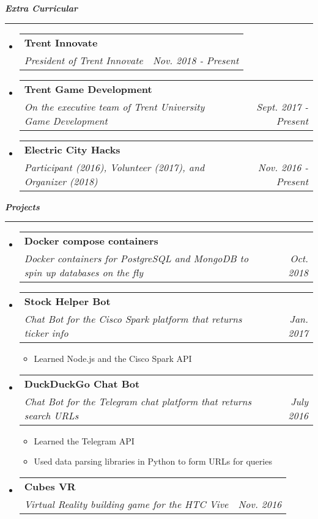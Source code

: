 \documentclass[letterpaper,11pt]{article}
\makeatletter
\newcommand{\resitem}[1]{\item #1 \vspace{-2pt}}
\newcommand{\mysection}[1]{\vspace{5pt} {\bfseries \textsl{#1}} \\ {\color{gray} \rule[5pt]{\textwidth}{1pt}}}
\newcommand{\ressubheading}[4]{\begin{tabular*}{6.5in}{l@{\extracolsep{\fill}}r}
        \textbf{#1} & #2 \\
        \textit{#3} & \textit{#4} \\
\end{tabular*}\vspace{-6pt}}
\makeatother
\begin{document}
\mysection{Extra Curricular}
\begin{itemize}
    \item
        \ressubheading{Trent Innovate}{}{President of Trent Innovate}{Nov. 2018 - Present}
    \item
        \ressubheading{Trent Game Development}{}{On the executive team of 
        Trent University Game Development}{Sept. 2017 - Present}
    \item
        \ressubheading{Electric City Hacks}{}{Participant (2016), Volunteer (2017), and Organizer (2018)}{Nov. 2016 - Present}
\end{itemize}

\mysection{Projects}
\begin{itemize}
    \item
        \ressubheading{Docker compose containers}{}{Docker containers for PostgreSQL and MongoDB to spin up databases on the fly}{Oct. 2018}
    \item
        \ressubheading{Stock Helper Bot}{}{Chat Bot for the Cisco Spark platform that returns ticker info}{Jan. 2017}
        \begin{itemize}
                \resitem{Learned Node.js and the Cisco Spark API}
        \end{itemize}
    \item
        \ressubheading{DuckDuckGo Chat Bot}{}{Chat Bot for the Telegram chat platform that returns search URLs}{July 2016}
        \begin{itemize}
                \resitem{Learned the Telegram API}
                \resitem{Used data parsing libraries in Python to form URLs for queries}
        \end{itemize}

    \item
        \ressubheading{Cubes VR}{}{Virtual Reality building game for the HTC Vive}{Nov. 2016}

\end{itemize}
\end{document}

